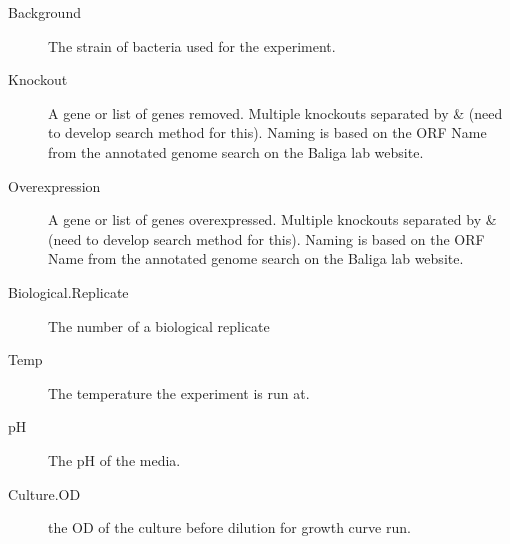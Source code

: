 \documentclass[11pt]{article}
\begin{document}
\begin{description}
\item[Background] The strain of bacteria used for the experiment.

\item[Knockout] A gene or list of genes removed. Multiple knockouts separated by \& (need to develop search method for this). Naming is based on the ORF Name from the annotated genome search on the Baliga lab website.

\item[Overexpression] A gene or list of genes overexpressed. Multiple knockouts separated by \& (need to develop search method for this). Naming is based on the ORF Name from the annotated genome search on the Baliga lab website.

\item[Biological.Replicate] The number of a biological replicate

\item[Temp] The temperature the experiment is run at.

\item[pH] The pH of the media.

\item[Culture.OD] the OD of the culture before dilution for growth curve run.


\end{description}
\end{document}
